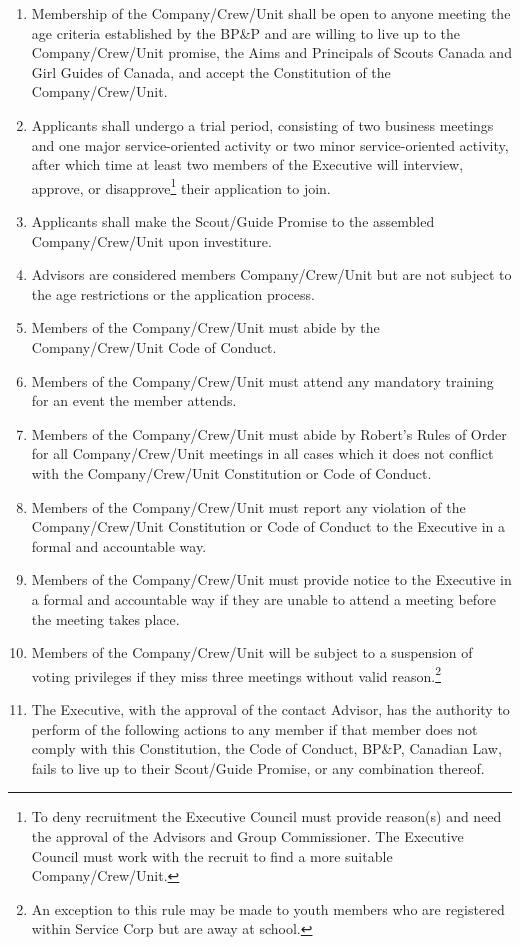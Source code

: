 \begin{enumerate}
    \item Membership of the Company/Crew/Unit shall be open to anyone meeting the age criteria established by the BP\&P and are willing to live up to the Company/Crew/Unit promise, the Aims and Principals of Scouts Canada and Girl Guides of Canada, and accept the Constitution of the Company/Crew/Unit.
    \item Applicants shall undergo a trial period, consisting of two business meetings and one major service-oriented activity or two minor service-oriented activity, after which time at least two members of the Executive will interview, approve, or disapprove\footnote{To deny recruitment the Executive Council must provide reason(s) and need the approval of the Advisors and Group Commissioner. The Executive Council must work with the recruit to find a more suitable Company/Crew/Unit.} their application to join.
    \item Applicants shall make the Scout/Guide Promise to the assembled Company/Crew/Unit upon investiture.
    \item Advisors are considered members Company/Crew/Unit but are not subject to the age restrictions or the application process.
    \item Members of the Company/Crew/Unit must abide by the Company/Crew/Unit Code of Conduct.
    \item Members of the Company/Crew/Unit must attend any mandatory training for an event the member attends.
    \item Members of the Company/Crew/Unit must abide by Robert's Rules of Order for all Company/Crew/Unit meetings in all cases which it does not conflict with the Company/Crew/Unit Constitution or Code of Conduct.
    \item Members of the Company/Crew/Unit must report any violation of the Company/Crew/Unit Constitution or Code of Conduct to the Executive in a formal and accountable way.
    \item Members of the Company/Crew/Unit must provide notice to the Executive in a formal and accountable way if they are unable to attend a meeting before the meeting takes place.
    \item Members of the Company/Crew/Unit will be subject to a suspension of voting privileges if they miss three meetings without valid reason.\footnote{An exception to this rule may be made to youth members who are registered within Service Corp but are away at school.}
    \item The Executive, with the approval of the contact Advisor, has the authority to perform of the following actions to any member if that member does not comply with this Constitution, the Code of Conduct, BP\&P, Canadian Law, fails to live up to their Scout/Guide Promise, or any combination thereof.

\end{enumerate}
